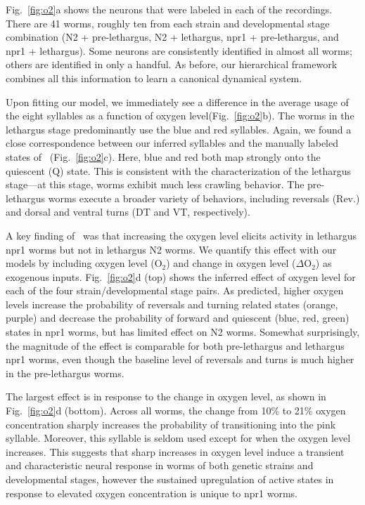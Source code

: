 \documentclass[11pt]{article}
\begin{document}
Fig.~\ref{fig:o2}a shows the neurons that were labeled in each of the
recordings. There are 41 worms, roughly ten from each strain and
developmental stage combination (N2 + pre-lethargus, N2 + lethargus,
npr1 + pre-lethargus, and npr1 + lethargus). Some neurons are
consistently identified in almost all worms; others are identified in
only a handful.  As before, our hierarchical framework combines all
this information to learn a canonical dynamical system.

Upon fitting our model, we immediately see a difference in the average
usage of the eight syllables as a function of oxygen
level(Fig.~\ref{fig:o2}b). The worms in the lethargus stage
predominantly use the blue and red syllables.  Again, we found a close
correspondence between our inferred syllables and the manually labeled
states of~\citet{nichols2017global} (Fig.~\ref{fig:o2}c). Here, blue
and red both map strongly onto the quiescent (\textsf{Q}) state. This
is consistent with the characterization of the lethargus stage---at
this stage, worms exhibit much less crawling behavior. The
pre-lethargus worms execute a broader variety of behaviors, including
reversals (\textsf{Rev.}) and dorsal and ventral turns (\textsf{DT}
and \textsf{VT}, respectively).

A key finding of~\citet{nichols2017global} was that increasing the
oxygen level elicits activity in lethargus npr1 worms but not in
lethargus N2 worms. We quantify this effect with our models by
including oxygen level (O$_2$) and change in oxygen level ($\Delta$O$_2$)
as exogenous inputs.
Fig.~\ref{fig:o2}d (top) shows the inferred effect of oxygen level for
each of the four strain/developmental stage pairs.  As predicted,
higher oxygen levels increase the probability of reversals and turning
related states (orange, purple) and decrease the probability of
forward and quiescent (blue, red, green) states in npr1 worms, but has
limited effect on N2 worms.  Somewhat surprisingly, the magnitude of
the effect is comparable for both pre-lethargus and lethargus npr1
worms, even though the baseline level of reversals and turns is much
higher in the pre-lethargus worms.

The largest effect is in response to the change in oxygen level, as
shown in Fig.~\ref{fig:o2}d (bottom).  Across all worms, the change
from 10\% to 21\% oxygen concentration sharply increases the probability
of transitioning into the pink syllable. Moreover, this syllable is seldom
used except for when the oxygen level increases.  This suggests that
sharp increases in oxygen level induce a transient and characteristic
neural response in worms of both genetic strains and developmental stages,
however the sustained upregulation of active states in response to elevated
oxygen concentration is unique to npr1 worms.
\end{document}
